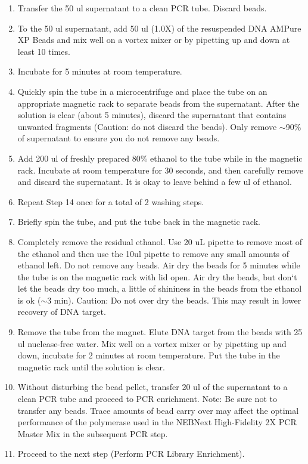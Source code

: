 \documentclass[11pt, oneside]{article}
\begin{document}
\begin{enumerate}
			\item Transfer the 50 ul supernatant to a clean PCR tube. Discard beads. 
			\item To the 50 ul supernatant, add 50 ul (1.0X) of the resuspended DNA AMPure XP Beads and mix well on a vortex mixer or by pipetting up 			and down at least 10 times. 
			\item Incubate for 5 minutes at room temperature.
			\item Quickly spin the tube in a microcentrifuge and place the tube on an appropriate magnetic rack to separate beads from the supernatant. 			After the solution is clear (about 5 minutes), discard the supernatant that contains unwanted fragments (Caution: do not discard the beads). 			Only remove $\sim$90\% of supernatant to ensure you do not remove any beads.
			\item Add 200 ul of freshly prepared 80\% ethanol to the tube while in the magnetic rack. Incubate at room temperature for 30 seconds, and 			then carefully remove and discard the supernatant. It is okay to leave behind a few ul of ethanol. 
			\item Repeat Step 14 once for a total of 2 washing steps.
			\item Briefly spin the tube, and put the tube back in the magnetic rack.
			\item Completely remove the residual ethanol. Use 20 uL pipette to remove most of the ethanol and then use the 10ul pipette to remove any 			small amounts of ethanol left. Do not remove any beads. Air dry the beads for 5 minutes while the tube is on the magnetic rack with lid open. 			Air dry the beads, but don`t let the beads dry too much, a little of shininess in the beads from the ethanol is ok ($\sim$3 min).  
			Caution: Do not over dry the beads. This may result in lower recovery of DNA target.
			\item Remove the tube from the magnet. Elute DNA target from the beads with 25 ul nuclease-free water. Mix well on a vortex mixer or by 			pipetting up and down, incubate for 2 minutes at room temperature. Put the tube in the magnetic rack until the solution is clear.
			\item Without disturbing the bead pellet, transfer 20 ul of the supernatant to a clean PCR tube and proceed to PCR enrichment. 
			Note: Be sure not to transfer any beads. Trace amounts of bead carry over may affect the optimal performance of the polymerase used in the 			NEBNext High-Fidelity 2X PCR Master Mix in the subsequent PCR step.
			\item Proceed to the next step (Perform PCR Library Enrichment).
		\end{enumerate}
		
\end{document}
